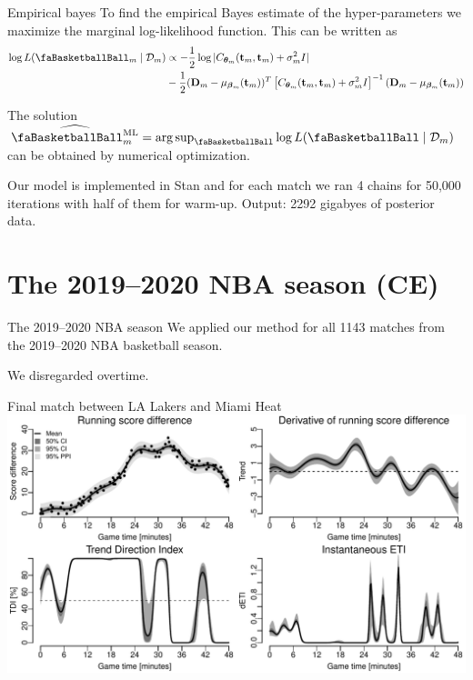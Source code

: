 \documentclass[ignorenonframetext,xcolor=pdflatex,table,dvipsnames,serif]{beamer}
\newcommand{\BTheta}{\text{\faBasketballBall}}
\DeclareMathOperator*{\argsup}{arg\,sup}
\begin{document}
\begin{frame}{Empirical bayes}
To find the empirical Bayes estimate of the hyper-parameters we maximize the marginal log-likelihood function. This can be written as
{
\footnotesize
\begin{align*}
\log L(\BTheta_m \mid \mathcal{D}_m) &\propto - \frac{1}{2}\log |C_{\bm{\theta}_m}(\mathbf{t}_m, \mathbf{t}_m) + \sigma_m^2 I|\\
&- \frac{1}{2}(\mathbf{D}_m - \mu_{\bm{\beta}_m}(\mathbf{t}_m))^T\left[C_{\bm{\theta}_m}(\mathbf{t}_m, \mathbf{t}_m) + \sigma_m^2 I\right]^{-1}(\mathbf{D}_m - \mu_{\bm{\beta}_m}(\mathbf{t}_m))
\end{align*}	
} 

The solution $\widehat{\BTheta_m^\text{ML}} = \argsup_{\BTheta} \log L(\BTheta \mid \mathcal{D}_m)$ can be obtained by numerical optimization.

Our model is implemented in Stan and for each match we ran 4 chains for 50,000 iterations with half of them for warm-up. Output: 2292 gigabyes of posterior data.
\end{frame}


\section{The 2019--2020 NBA season (CE)}

\begin{frame}{The 2019--2020 NBA season}
We applied our method for all 1143 matches from the 2019--2020 NBA basketball season.

We disregarded overtime.
\end{frame}

\begin{frame}{Final match between LA Lakers and Miami Heat}
\includegraphics[scale=0.5]{fig2.pdf}
\end{frame}
\end{document}
